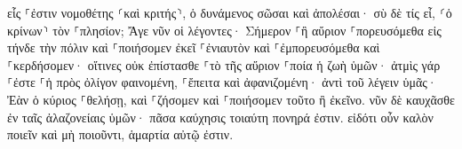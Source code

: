 \documentclass{openreader}
\begin{document}
εἷς ⸀ἐστιν νομοθέτης ⸂καὶ κριτής⸃, ὁ δυνάμενος σῶσαι καὶ ἀπολέσαι· σὺ δὲ τίς εἶ, ⸂ὁ κρίνων⸃ τὸν ⸀πλησίον; 
Ἄγε νῦν οἱ λέγοντες· Σήμερον ⸀ἢ αὔριον ⸀πορευσόμεθα εἰς τήνδε τὴν πόλιν καὶ ⸀ποιήσομεν ἐκεῖ ⸀ἐνιαυτὸν καὶ ⸀ἐμπορευσόμεθα καὶ ⸀κερδήσομεν· 
οἵτινες οὐκ ἐπίστασθε ⸀τὸ τῆς αὔριον ⸀ποία ἡ ζωὴ ὑμῶν· ἀτμὶς γάρ ⸀ἐστε ⸀ἡ πρὸς ὀλίγον φαινομένη, ⸀ἔπειτα καὶ ἀφανιζομένη· 
ἀντὶ τοῦ λέγειν ὑμᾶς· Ἐὰν ὁ κύριος ⸀θελήσῃ, καὶ ⸀ζήσομεν καὶ ⸀ποιήσομεν τοῦτο ἢ ἐκεῖνο. 
νῦν δὲ καυχᾶσθε ἐν ταῖς ἀλαζονείαις ὑμῶν· πᾶσα καύχησις τοιαύτη πονηρά ἐστιν. 
εἰδότι οὖν καλὸν ποιεῖν καὶ μὴ ποιοῦντι, ἁμαρτία αὐτῷ ἐστιν. 
\end{document}
